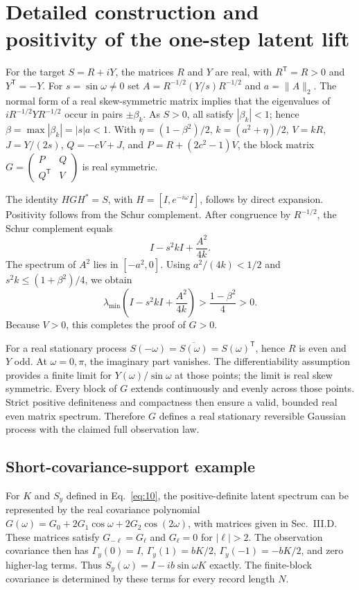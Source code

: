 \section{Detailed construction and positivity of the one-step latent lift}\label{app:lift}
For the target $S=R+iY$, the matrices $R$ and $Y$ are real, with $R^\mathsf T=R>0$ and $Y^\mathsf T=-Y$. For $s=\sin\omega\ne0$ set $A=R^{-1/2}(Y/s)R^{-1/2}$ and $a=\|A\|_2$. The normal form of a real skew-symmetric matrix implies that the eigenvalues of $iR^{-1/2}YR^{-1/2}$ occur in pairs $\pm\beta_k$. As $S>0$, all satisfy $|\beta_k|<1$; hence $\beta=\max|\beta_k|=|s|a<1$. With $\eta=(1-\beta^2)/2$, $k=(a^2+\eta)/2$, $V=kR$, $J=Y/(2s)$, $Q=-cV+J$, and $P=R+(2c^2-1)V$, the block matrix $G=\left(\begin{smallmatrix}P&Q\\Q^\mathsf T&V\end{smallmatrix}\right)$ is real symmetric.

The identity $HGH^*=S$, with $H=[I,e^{-i\omega}I]$, follows by direct expansion. Positivity follows from the Schur complement. After congruence by $R^{-1/2}$, the Schur complement equals
\begin{equation}
 I-s^2kI+\frac{A^2}{4k}.
\end{equation}
The spectrum of $A^2$ lies in $[-a^2,0]$. Using $a^2/(4k)<1/2$ and $s^2k\le(1+\beta^2)/4$, we obtain
\begin{equation}
 \lambda_{\min}\!\left(I-s^2kI+\frac{A^2}{4k}\right)>
 \frac{1-\beta^2}{4}>0.
\end{equation}
Because $V>0$, this completes the proof of $G>0$.

For a real stationary process $S(-\omega)=\overline{S(\omega)}=S(\omega)^{\mathsf T}$, hence $R$ is even and $Y$ odd. At $\omega=0,\pi$, the imaginary part vanishes. The differentiability assumption provides a finite limit for $Y(\omega)/\sin\omega$ at those points; the limit is real skew symmetric. Every block of $G$ extends continuously and evenly across those points. Strict positive definiteness and compactness then ensure a valid, bounded real even matrix spectrum. Therefore $G$ defines a real stationary reversible Gaussian process with the claimed full observation law.

\subsection{Short-covariance-support example}
For $K$ and $S_y$ defined in Eq.~\eqref{eq:10}, the positive-definite latent spectrum can be represented by the real covariance polynomial $G(\omega)=G_0+2G_1\cos\omega+2G_2\cos(2\omega)$, with matrices given in Sec.~III.D. These matrices satisfy $G_{-\ell}=G_\ell$ and $G_\ell=0$ for $|\ell|>2$. The observation covariance then has $\Gamma_y(0)=I$, $\Gamma_y(1)=bK/2$, $\Gamma_y(-1)=-bK/2$, and zero higher-lag terms. Thus $S_y(\omega)=I-ib\sin\omega K$ exactly. The finite-block covariance is determined by these terms for every record length $N$.

